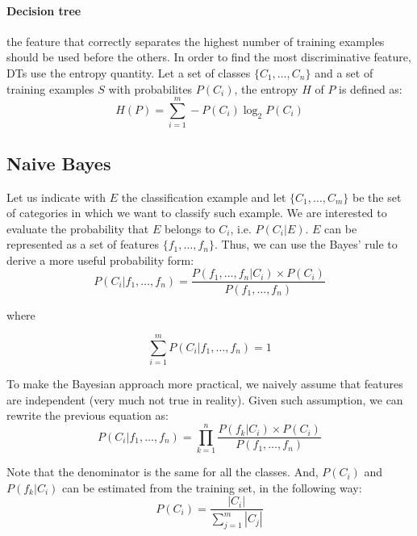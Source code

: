\paragraph{Decision tree} the feature that correctly separates the highest
number of training examples should be used before the others. In order to find
the most discriminative feature, DTs use the entropy quantity. Let a set of
classes $\{C_1, \dots, C_n\}$ and a set of training examples $S$ with
probabilites $P(C_i)$, the entropy $H$ of $P$ is defined as:
\begin{equation}
	H(P) = \sum_{i=1}^{m} - P(C_i) \log_2 P(C_i)
\end{equation}

\subsection{Naive Bayes}

Let us indicate with $E$ the classification example and let $\{C_1, \dots, 
C_m\}$ be the set of categories in which we want to classify such example. We
are interested to evaluate the probability that $E$ belongs to $C_i$, i.e.
$P(C_i|E)$. $E$ can be represented as a set of features $\{f_1, \dots, f_n\}$.
Thus, we can use the Bayes' rule to derive a more useful probability form:
\begin{equation}
	P(C_i|f_1, \dots, f_n) = 
	\frac{P(f_1, \dots, f_n|C_i) \times P(C_i)}
	{P(f_1, \dots, f_n)}
\end{equation}

where

\begin{equation*}
	\sum_{i=1}^{m} P(C_i|f_1, \dots, f_n) = 1
\end{equation*}

To make the Bayesian approach more practical, we naively assume that features
are independent (very much not true in reality). Given such assumption, we can
rewrite the previous equation as:
\begin{equation}
	P(C_i|f_1, \dots, f_n) = 
	\prod_{k=1}^{n} \frac{P(f_k|C_i) \times P(C_i)}
	{P(f_1, \dots, f_n)}
\end{equation}

Note that the denominator is the same for all the classes.
And, $P(C_i)$ and $P(f_k|C_i)$ can be estimated from the training set, in the
following way:
\begin{equation*}
	P(C_i) = 
	\frac{|C_i|}
	{\sum_{j=1}^{m} |C_j|}
\end{equation*}

